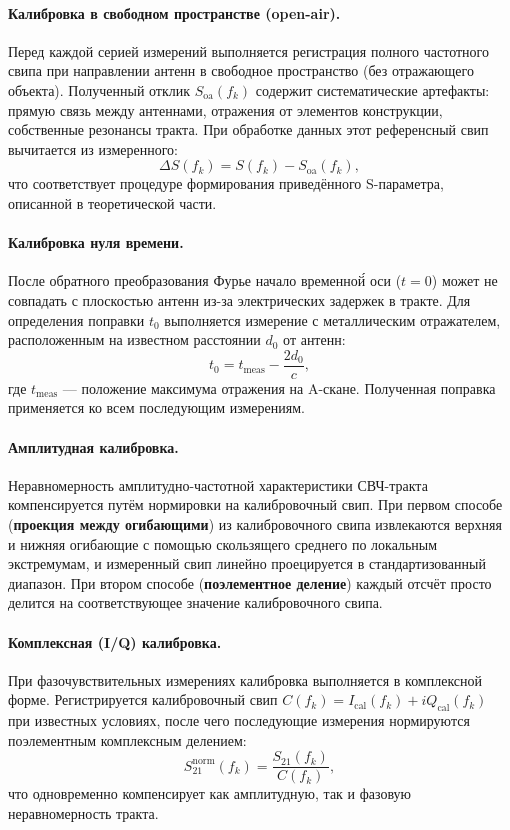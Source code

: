 \paragraph{Калибровка в свободном пространстве (open-air).}
Перед каждой серией измерений выполняется регистрация полного частотного
свипа при направлении антенн в свободное пространство (без отражающего
объекта). Полученный отклик $S_{\mathrm{oa}}(f_k)$ содержит систематические
артефакты: прямую связь между антеннами, отражения от элементов конструкции,
собственные резонансы тракта. При обработке данных этот референсный свип
вычитается из измеренного:
\begin{equation}
    \Delta S(f_k) = S(f_k) - S_{\mathrm{oa}}(f_k),
    \label{eq:open-air-subtraction}
\end{equation}
что соответствует процедуре формирования приведённого S-параметра, описанной
в теоретической части.

\paragraph{Калибровка нуля времени.}
После обратного преобразования Фурье начало временно\'{й} оси ($t = 0$) может
не совпадать с плоскостью антенн из-за электрических задержек в тракте. Для
определения поправки $t_0$ выполняется измерение с металлическим отражателем,
расположенным на известном расстоянии $d_0$ от антенн:
\begin{equation}
    t_0 = t_{\mathrm{meas}} - \frac{2d_0}{c},
    \label{eq:t0-calibration}
\end{equation}
где $t_{\mathrm{meas}}$ --- положение максимума отражения на A-скане.
Полученная поправка применяется ко всем последующим измерениям.

\paragraph{Амплитудная калибровка.}
Неравномерность амплитудно-частотной характеристики СВЧ-тракта
компенсируется путём нормировки на калибровочный свип. При первом способе
(\textbf{проекция между огибающими}) из калибровочного свипа извлекаются
верхняя и нижняя огибающие с помощью скользящего среднего по локальным
экстремумам, и измеренный свип линейно проецируется в стандартизованный
диапазон. При втором способе (\textbf{поэлементное деление}) каждый отсчёт
просто делится на соответствующее значение калибровочного свипа.

\paragraph{Комплексная (I/Q) калибровка.}
При фазочувствительных измерениях калибровка выполняется в комплексной
форме. Регистрируется калибровочный свип $C(f_k) = I_{\mathrm{cal}}(f_k) +
iQ_{\mathrm{cal}}(f_k)$ при известных условиях, после чего последующие
измерения нормируются поэлементным комплексным делением:
\begin{equation}
    S_{21}^{\mathrm{norm}}(f_k) = \frac{S_{21}(f_k)}{C(f_k)},
    \label{eq:complex-cal}
\end{equation}
что одновременно компенсирует как амплитудную, так и фазовую неравномерность
тракта.

